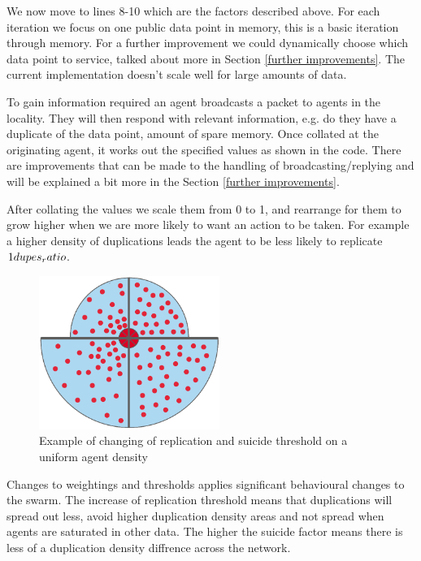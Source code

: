 \documentclass{UoYCSproject}
\begin{document}
We now move to lines 8-10 which are the factors described above.
For each iteration we focus on one public data point in memory, this is a basic iteration through memory. 
For a further improvement we could dynamically choose which data point to service, talked about more in Section \ref{further improvements}. 
The current implementation doesn’t scale well for large amounts of data.


To gain information required an agent broadcasts a packet to agents in the locality. 
They will then respond with relevant information, e.g. do they have a duplicate of the data point, amount of spare memory. 
Once collated at the originating agent, it works out the specified values as shown in the code.
There are improvements that can be made to the handling of broadcasting/replying and will be explained a bit more in the Section \ref{further improvements}.

After collating the values we scale them from 0 to 1, and rearrange for them to grow higher when we are more likely to want an action to be taken.
For example a higher density of duplications leads the agent to be less likely to replicate \(1\-dupes_ratio\).

\begin{figure}[htb]
\label{fig:changing}
\begin{center}
\centering
\includegraphics[height=5cm]{"./ExplanationImgs/planned_changes.png"}
\caption{Example of changing of replication and suicide threshold on a uniform agent density}
\end{center}
\end{figure}

Changes to weightings and thresholds applies significant behavioural changes to the swarm.
The increase of replication threshold means that duplications will spread out less, avoid higher duplication density areas and not spread when agents are saturated in other data.
The higher the suicide factor means there is less of a duplication density diffrence across the network.
\end{document}
